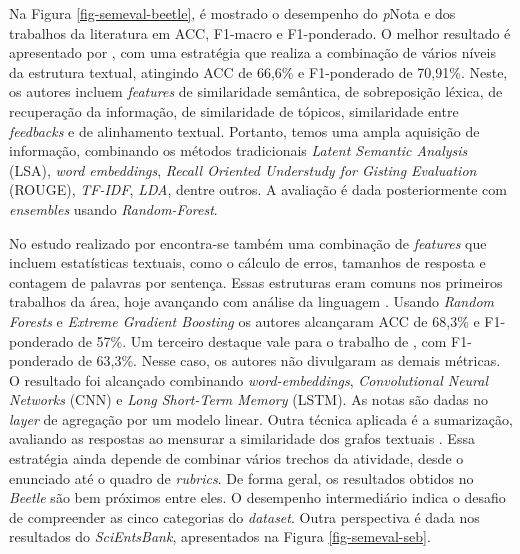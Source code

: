 Na Figura \ref{fig-semeval-beetle}, é mostrado o desempenho do \textit{p}Nota e dos trabalhos da literatura em ACC, F1-macro e F1-ponderado. O melhor resultado é apresentado por \cite{sahu2020}, com uma estratégia que realiza a combinação de vários níveis da estrutura textual, atingindo ACC de 66,6\% e F1-ponderado de 70,91\%. Neste, os autores incluem \textit{features} de similaridade semântica, de sobreposição léxica, de recuperação da informação, de similaridade de tópicos, similaridade entre \textit{feedbacks} e de alinhamento textual. Portanto, temos uma ampla aquisição de informação, combinando os métodos tradicionais \textit{Latent Semantic Analysis} (LSA), \textit{word embeddings}, \textit{Recall Oriented Understudy for Gisting Evaluation} (ROUGE), \textit{TF-IDF}, \textit{LDA}, dentre outros. A avaliação é dada posteriormente com \textit{ensembles} usando \textit{Random-Forest}.

No estudo realizado por \cite{galhardi2018c} encontra-se também uma combinação de \textit{features} que incluem estatísticas textuais, como o cálculo de erros, tamanhos de resposta e contagem de palavras por sentença. Essas estruturas eram comuns nos primeiros trabalhos da área, hoje avançando com análise da linguagem \cite{burrows2015}. Usando \textit{Random Forests} e \textit{Extreme Gradient Boosting} os autores alcançaram ACC de 68,3\% e F1-ponderado de 57\%. Um terceiro destaque vale para o trabalho de \cite{riordan2017}, com F1-ponderado de 63,3\%. Nesse caso, os autores não divulgaram as demais métricas. O resultado foi alcançado combinando \textit{word-embeddings}, \textit{Convolutional Neural Networks} (CNN) e \textit{Long Short-Term Memory} (LSTM). As notas são dadas no \textit{layer} de agregação por um modelo linear. Outra técnica aplicada é a sumarização, avaliando as respostas ao mensurar a similaridade dos grafos textuais \cite{ramachandran2015a, ramachandran2015b}. Essa estratégia ainda depende de combinar vários trechos da atividade, desde o enunciado até o quadro de \textit{rubrics}. De forma geral, os resultados obtidos no \textit{Beetle} são bem próximos entre eles. O desempenho intermediário indica o desafio de compreender as cinco categorias do \textit{dataset}. Outra perspectiva é dada nos resultados do \textit{SciEntsBank}, apresentados na Figura \ref{fig-semeval-seb}.

